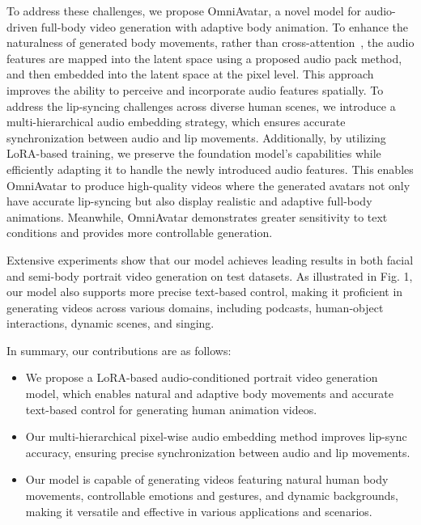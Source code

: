 To address these challenges, we propose OmniAvatar, a novel model for audio-driven full-body video generation with adaptive body animation. To enhance the naturalness of generated body movements, rather than cross-attention~\cite{cui2024hallo3,wang2025fantasytalking}, the audio features are mapped into the latent space using a proposed audio pack method, and then embedded into the latent space at the pixel level. This approach improves the  ability to perceive and incorporate audio features spatially. To address the lip-syncing challenges across diverse human scenes, we introduce a multi-hierarchical audio embedding strategy, which ensures accurate synchronization between audio and lip movements. Additionally, by utilizing LoRA-based training, we preserve the foundation model’s capabilities while efficiently adapting it to handle the newly introduced audio features. This enables OmniAvatar to produce high-quality videos where the generated avatars not only have accurate lip-syncing but also display realistic and adaptive full-body animations. Meanwhile, OmniAvatar demonstrates greater sensitivity to text conditions and provides more controllable generation.

Extensive experiments show that our model achieves leading results in both facial and semi-body portrait video generation on test datasets. As illustrated in Fig. 1, our model also supports more precise text-based control, making it proficient in generating videos across various domains, including podcasts, human-object interactions, dynamic scenes, and singing. 

In summary, our contributions are as follows:

\begin{itemize}
\item We propose a LoRA-based audio-conditioned portrait video generation model, which enables natural and adaptive body movements and accurate text-based control for generating human animation videos.

\item Our multi-hierarchical pixel-wise audio embedding method improves lip-sync accuracy, ensuring precise synchronization between audio and lip movements.

\item Our model is capable of generating videos featuring natural human body movements, controllable emotions and gestures, and dynamic backgrounds, making it versatile and effective in various applications and scenarios.
\end{itemize}